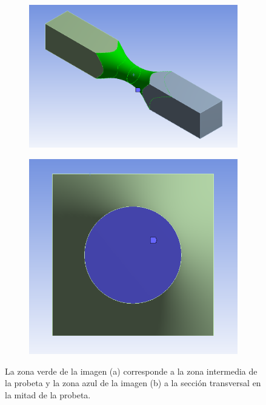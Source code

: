 \begin{figure}[t]
\centering
	\begin{subfigure}{0.5\linewidth}
		\centering
		\includegraphics[width=0.82\linewidth]{Imagenes/zona_media.PNG}
		\caption{}\label{fig:zona_media}
	\end{subfigure}%
	\begin{subfigure}{0.5\linewidth}
		\centering
		\includegraphics[width=0.6\linewidth]{Imagenes/cara_corte.PNG}
		\caption{}\label{fig:cara_corte}
	\end{subfigure}%
\caption{La zona verde de la imagen (a) corresponde a la zona intermedia de la probeta y la zona azul de la imagen (b) a la sección transversal en la mitad de la probeta.}
\label{fig:zona_probeta}
\end{figure}

